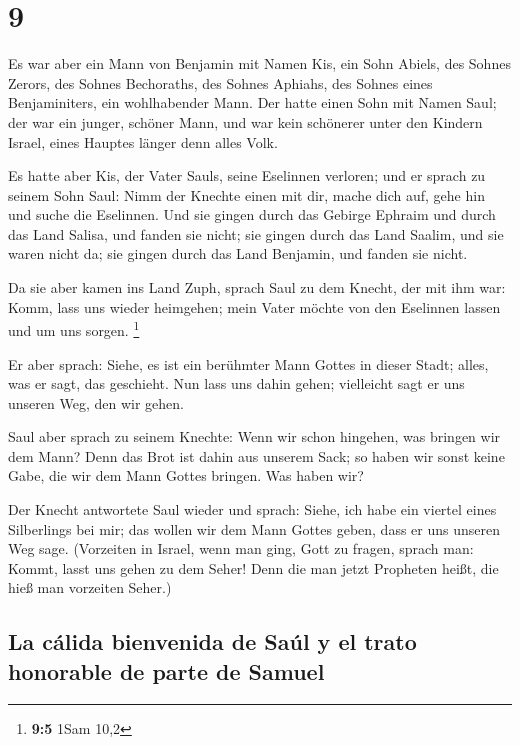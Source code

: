 \hypertarget{section-8}{%
\section{9}\label{section-8}}

 Es war aber ein Mann von Benjamin mit Namen Kis, ein Sohn
Abiels, des Sohnes Zerors, des Sohnes Bechoraths, des Sohnes Aphiahs,
des Sohnes eines Benjaminiters, ein wohlhabender Mann. 
Der hatte einen Sohn mit Namen Saul; der war ein junger, schöner Mann,
und war kein schönerer unter den Kindern Israel, eines Hauptes länger
denn alles Volk.

 Es hatte aber Kis, der Vater Sauls, seine Eselinnen
verloren; und er sprach zu seinem Sohn Saul: Nimm der Knechte einen mit
dir, mache dich auf, gehe hin und suche die Eselinnen. 
Und sie gingen durch das Gebirge Ephraim und durch das Land Salisa, und
fanden sie nicht; sie gingen durch das Land Saalim, und sie waren nicht
da; sie gingen durch das Land Benjamin, und fanden sie nicht.

 Da sie aber kamen ins Land Zuph, sprach Saul zu dem
Knecht, der mit ihm war: Komm, lass uns wieder heimgehen; mein Vater
möchte von den Eselinnen lassen und um uns sorgen. \footnote{\textbf{9:5}
  1Sam 10,2}

 Er aber sprach: Siehe, es ist ein berühmter Mann Gottes
in dieser Stadt; alles, was er sagt, das geschieht. Nun lass uns dahin
gehen; vielleicht sagt er uns unseren Weg, den wir gehen.

 Saul aber sprach zu seinem Knechte: Wenn wir schon
hingehen, was bringen wir dem Mann? Denn das Brot ist dahin aus unserem
Sack; so haben wir sonst keine Gabe, die wir dem Mann Gottes bringen.
Was haben wir?

 Der Knecht antwortete Saul wieder und sprach: Siehe, ich
habe ein viertel eines Silberlings bei mir; das wollen wir dem Mann
Gottes geben, dass er uns unseren Weg sage.  (Vorzeiten in
Israel, wenn man ging, Gott zu fragen, sprach man: Kommt, lasst uns
gehen zu dem Seher! Denn die man jetzt Propheten heißt, die hieß man
vorzeiten Seher.)

\hypertarget{la-cuxe1lida-bienvenida-de-sauxfal-y-el-trato-honorable-de-parte-de-samuel}{%
\subsection{La cálida bienvenida de Saúl y el trato honorable de parte
de
Samuel}\label{la-cuxe1lida-bienvenida-de-sauxfal-y-el-trato-honorable-de-parte-de-samuel}}

